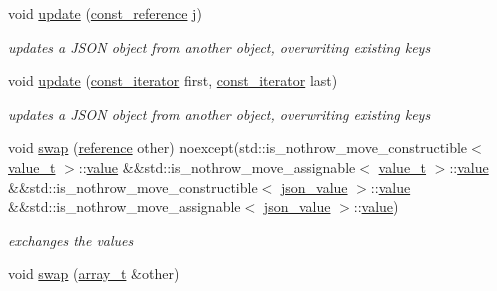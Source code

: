 \begin{DoxyCompactItemize}
void \hyperlink{classnlohmann_1_1basic__json_a377819905d567f6f523dcbc592cb6356}{update} (\hyperlink{classnlohmann_1_1basic__json_ab8a1c33ee7b154fc41ca2545aa9724e6}{const\+\_\+reference} j)
\begin{DoxyCompactList}\small\item\em updates a J\+S\+ON object from another object, overwriting existing keys \end{DoxyCompactList}\item 
void \hyperlink{classnlohmann_1_1basic__json_a9f9e5f668474280acc9bd7f5410b9392}{update} (\hyperlink{classnlohmann_1_1basic__json_aebd2cfa7e4ded4e97cde9269bfeeea38}{const\+\_\+iterator} first, \hyperlink{classnlohmann_1_1basic__json_aebd2cfa7e4ded4e97cde9269bfeeea38}{const\+\_\+iterator} last)
\begin{DoxyCompactList}\small\item\em updates a J\+S\+ON object from another object, overwriting existing keys \end{DoxyCompactList}\item 
void \hyperlink{classnlohmann_1_1basic__json_a94295a06e0e7b3867fe83afbee4cb202}{swap} (\hyperlink{classnlohmann_1_1basic__json_a220ae98554a76205fb7f8822d36b2d5a}{reference} other) noexcept(std\+::is\+\_\+nothrow\+\_\+move\+\_\+constructible$<$ \hyperlink{namespacenlohmann_1_1detail_a1ed8fc6239da25abcaf681d30ace4985}{value\+\_\+t} $>$\+::\hyperlink{classnlohmann_1_1basic__json_ac9e014095170d72c4c57e3daf8efc059}{value} \&\&std\+::is\+\_\+nothrow\+\_\+move\+\_\+assignable$<$ \hyperlink{namespacenlohmann_1_1detail_a1ed8fc6239da25abcaf681d30ace4985}{value\+\_\+t} $>$\+::\hyperlink{classnlohmann_1_1basic__json_ac9e014095170d72c4c57e3daf8efc059}{value} \&\&std\+::is\+\_\+nothrow\+\_\+move\+\_\+constructible$<$ \hyperlink{classnlohmann_1_1basic__json_abcfe744b08e2cd81508ce9bf7ebc86cf}{json\+\_\+value} $>$\+::\hyperlink{classnlohmann_1_1basic__json_ac9e014095170d72c4c57e3daf8efc059}{value} \&\&std\+::is\+\_\+nothrow\+\_\+move\+\_\+assignable$<$ \hyperlink{classnlohmann_1_1basic__json_abcfe744b08e2cd81508ce9bf7ebc86cf}{json\+\_\+value} $>$\+::\hyperlink{classnlohmann_1_1basic__json_ac9e014095170d72c4c57e3daf8efc059}{value})
\begin{DoxyCompactList}\small\item\em exchanges the values \end{DoxyCompactList}\item 
void \hyperlink{classnlohmann_1_1basic__json_a76126242de262f6d38cadda19e0d13e1}{swap} (\hyperlink{classnlohmann_1_1basic__json_a53700c308d804f84aea5ff05abb2ac4e}{array\+\_\+t} \&other)

\end{DoxyCompactItemize}
